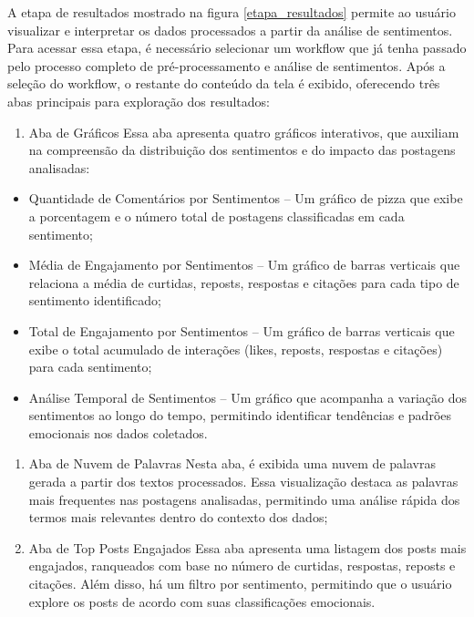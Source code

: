 \documentclass[
	12pt,				%
	oneside,			%
	a4paper,			%
	english,			%
	french,				%
	spanish,			%
	brazil				%
	]{abntex2}
\begin{document}
A etapa de resultados mostrado na figura \ref{etapa_resultados} permite
ao usuário visualizar e interpretar os dados processados a partir da
análise de sentimentos. Para acessar essa etapa, é necessário selecionar
um workflow que já tenha passado pelo processo completo de
pré-processamento e análise de sentimentos. Após a seleção do workflow,
o restante do conteúdo da tela é exibido, oferecendo três abas
principais para exploração dos resultados:

\begin{enumerate}
\def\labelenumi{\arabic{enumi})}
\tightlist
\item
  Aba de Gráficos Essa aba apresenta quatro gráficos interativos, que
  auxiliam na compreensão da distribuição dos sentimentos e do impacto
  das postagens analisadas:
\end{enumerate}

\begin{itemize}
\tightlist
\item
  Quantidade de Comentários por Sentimentos -- Um gráfico de pizza que
  exibe a porcentagem e o número total de postagens classificadas em
  cada sentimento;
\item
  Média de Engajamento por Sentimentos -- Um gráfico de barras verticais
  que relaciona a média de curtidas, reposts, respostas e citações para
  cada tipo de sentimento identificado;
\item
  Total de Engajamento por Sentimentos -- Um gráfico de barras verticais
  que exibe o total acumulado de interações (likes, reposts, respostas e
  citações) para cada sentimento;
\item
  Análise Temporal de Sentimentos -- Um gráfico que acompanha a variação
  dos sentimentos ao longo do tempo, permitindo identificar tendências e
  padrões emocionais nos dados coletados.
\end{itemize}

\begin{enumerate}
\def\labelenumi{\arabic{enumi})}
\item
  Aba de Nuvem de Palavras Nesta aba, é exibida uma nuvem de palavras
  gerada a partir dos textos processados. Essa visualização destaca as
  palavras mais frequentes nas postagens analisadas, permitindo uma
  análise rápida dos termos mais relevantes dentro do contexto dos
  dados;
\item
  Aba de Top Posts Engajados Essa aba apresenta uma listagem dos posts
  mais engajados, ranqueados com base no número de curtidas, respostas,
  reposts e citações. Além disso, há um filtro por sentimento,
  permitindo que o usuário explore os posts de acordo com suas
  classificações emocionais.
\end{enumerate}
\end{document}
